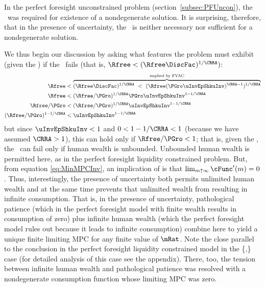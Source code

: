 \documentclass[./BufferStockTheory.tex]{subfiles}
\begin{document}
In the perfect foresight unconstrained problem
(section~\ref{subsec:PFUncon}), the \RIC~was required for existence of
a nondegenerate solution.  It is surprising, therefore, that in the
presence of uncertainty, the \RIC~is neither necessary nor sufficient
for a nondegenerate solution.
\begin{comment}
But if the \RIC~does hold, some useful results can be derived.  Arguably
the most fundamental are that the limiting values
for the minimal and maximal marginal propensities to consume implicit in
\eqref{eq:MaxMPCInv} and \eqref{eq:MinMPCInv} are positive and finite.
\end{comment}
We thus begin our discussion by asking what features the problem must
exhibit (given the \FVAC) if the \RIC~fails (that is, $\Rfree < (\Rfree \DiscFac)^{1/\CRRA})$:
\begin{align}
    \Rfree   & < \overbrace{(\Rfree \DiscFac)^{1/\CRRA} ~ < ~ (\Rfree (\PGro \uInvEpShkuInv)^{\CRRA-1})^{1/\CRRA}}^{\text{implied by \FVAC}} \notag
\\  \Rfree   & < (\Rfree/\PGro)^{1/\CRRA}\PGro \uInvEpShkuInv^{1-1/\CRRA} \notag
\\  \Rfree/\PGro  & < (\Rfree/\PGro)^{1/\CRRA}\uInvEpShkuInv^{1-1/\CRRA} \notag
\\  (\Rfree/\PGro)^{1-1/\CRRA}  & < \uInvEpShkuInv^{1-1/\CRRA} \label{eq:RICimplies}
\end{align}
but since $\uInvEpShkuInv<1$ and $0 < 1-1/\CRRA < 1$ (because we have
assumed $\CRRA > 1$), this can hold only if $\Rfree/\PGro < 1$; that
is, given the \FVAC, the \RIC~can fail only if human wealth is
unbounded.  Unbounded human wealth is permitted here, as in the
perfect foresight liquidity constrained problem.  But,
 from  equation
\eqref{eq:MinMPCInv}, an implication of \cncl{\RIC} is that $\lim_{m
  \uparrow \infty} \cFunc^{\prime}(m) = 0$.  Thus, interestingly,
the presence of uncertainty both permits unlimited human wealth and at
the same time prevents that unlimited wealth from resulting in
infinite consumption.  That is, in the presence of uncertainty,
pathological patience (which in the perfect foresight model with
finite wealth results in consumption of zero) plus infinite human
wealth (which the perfect foresight model rules out because it leads
to infinite consumption) combine here to yield a unique finite
limiting MPC for any finite value of $\mRat$.  Note
the close parallel to the conclusion in the perfect foresight
liquidity constrained model in the
\{\PFGIC,\cncl{\RIC}\} case (for detailed analysis of this
case see the appendix).  There, too, the tension between infinite human wealth
and pathological patience was resolved with a nondegenerate consumption function
whose limiting MPC was zero.
\end{document}
